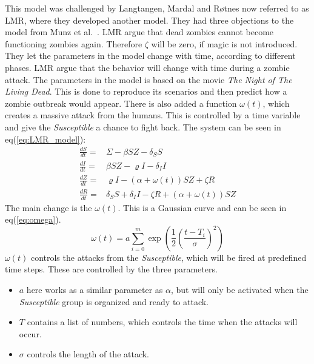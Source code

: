 \documentclass[%
twoside,                 %
final,                   %
10pt]{article}
\begin{document}
This model was challenged by Langtangen, Mardal and Røtnes \cite{zombie-math} now referred to as LMR, where they developed another model. They had three objections to the model from Munz et al.~\cite{munz2009zombies}. LMR argue that dead zombies cannot become functioning zombies again. Therefore $\zeta$ will be zero, if magic is not introduced. They let the parameters in the model change with time, according to different phases. LMR argue that the behavior will change with time during a zombie attack. The parameters in the model is based on the movie \emph{The Night of The Living Dead}. This is done to reproduce its scenarios and then predict how a zombie outbreak would appear. There is also added a function $\omega(t)$, which creates a massive attack from the humans. This is controlled by a time variable and give the \emph{Susceptible} a chance to fight back. The system can be seen in eq(\ref{eq:LMR_model}):
\begin{equation} \label{eq:LMR_model}
	\begin{aligned} 
	\frac{dS}{dt} =& \Sigma -\beta SZ - \delta_SS \\
	\frac{dI}{dt} =& \beta SZ - \varrho I - \delta_II\\
	\frac{dZ}{dt} =& \varrho I- (\alpha+\omega(t))SZ + \zeta R\\
	\frac{dR}{dt} =& \delta_SS +\delta_II -\zeta R + (\alpha+\omega(t))SZ 
	\end{aligned}
\end{equation}
The main change is the $\omega(t)$. This is a Gaussian curve and can be seen in eq(\ref{eq:omega}).
\begin{equation} \label{eq:omega}
\omega(t) = a \sum^m_{i=0}\exp\left(\frac{1}{2}\left(\frac{t-T_i}{\sigma}\right)^2\right)
\end{equation}
$\omega(t)$ controls the attacks from the \emph{Susceptible}, which will be fired at predefined time steps. These are controlled by the three parameters. 
\begin{itemize}
\item $a$ here works as a similar parameter as $\alpha$, but will only be activated when the \emph{Susceptible} group is organized and ready to attack. 

\item $T$ contains a list of numbers, which controls the time when the attacks will occur.

\item $\sigma$ controls the length of the attack. 
\end{itemize}
\end{document}
